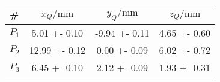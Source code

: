 \begin{tabular}{lSSS}
\toprule

{\#} & {$x_Q / \si{\milli\metre}$} & {$y_Q / \si{\milli\metre}$} & {$z_Q / \si{\milli\metre}$}\\

\midrule

$P_1$ & 5.01 +- 0.10 & -9.94 +- 0.11 & 4.65 +- 0.60 \\
$P_2$ & 12.99 +- 0.12 & 0.00 +- 0.09 & 6.02 +- 0.72 \\
$P_3$ & 6.45 +- 0.10 & 2.12 +- 0.09 & 1.93 +- 0.31\\

\bottomrule
\end{tabular}